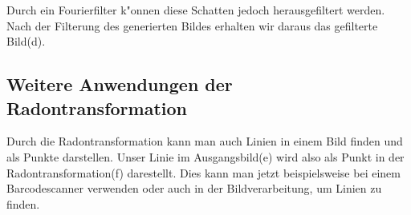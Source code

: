 Durch ein Fourierfilter k"onnen diese Schatten jedoch herausgefiltert
werden. Nach der Filterung des generierten Bildes erhalten wir daraus
das gefilterte Bild(d).

\begin{figure}[ht!]\centering
\end{figure}
\FloatBarrier

\subsection{Weitere Anwendungen der Radontransformation}

Durch die Radontransformation kann man auch Linien in einem Bild finden
und als Punkte darstellen. Unser Linie im Ausgangsbild(e) wird also als
Punkt in der Radontransformation(f) darestellt. Dies kann man jetzt
beispielsweise bei einem Barcodescanner verwenden oder auch in der
Bildverarbeitung, um Linien zu finden.

